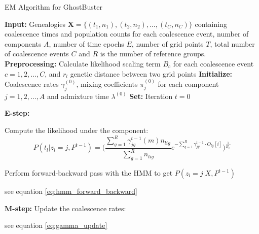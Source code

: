 \begin{algorithm}
\caption{EM Algorithm for GhostBuster}
\begin{algorithmic}[1]
\State \textbf{Input:} Genealogies $\mathbf{X} = \{(t_1,n_1), (t_2,n_2), \dots, (t_C,n_C)\}$ containing coalescence times and population counts for each coalescence event, number of components $A$, number of time epochs $E$, number of grid points $T$, total number of coalescence events $C$ and $R$ is the number of reference groups.
\State \textbf{Preprocessing:} Calculate likelihood scaling term $B_c$ for each coalescence event $c = 1, 2, \dots, C$, and $r_l$ genetic distance between two grid points
\State \textbf{Initialize:} Coalescence rates $\gamma_j^{(0)}$, mixing coefficients $\pi_j^{(0)}$ for each component $j = 1, 2, \dots, A$ and admixture time $\lambda^{(0)}$ 
\State \textbf{Set:} Iteration $t = 0$

\Repeat

    \State \textbf{E-step:} 
    

    
                        

            \vspace{2mm}
            
            \State Compute the likelihood under the component:
            \[
               P(t_l \vert z_l=j, P^{t-1}) =  \Big( \frac{\sum_{g=1}^R\gamma^{t-1}_{jg}(m)n_{lig}}{\sum_{g=1}^R n_{lig}}e^{-\sum_{g=1}^R \gamma^{t-1}_{jg} \cdot O_{lg}[i]} \Big)^{\frac{1}{B_{li}}}
            \]
        \EndFor
        
        \State Perform forward-backward pass with the HMM to get $P(z_l = j | X, P^{t-1})$ 

        \hspace{7mm} see equation \ref{eq:hmm_forward_backward}

        
    \EndFor
    
    \State \textbf{M-step:}
        \State Update the coalescence rates:
        
        \hspace{7mm} see equation \ref{eq:gamma_update}


\end{algorithmic}
\end{algorithm}
